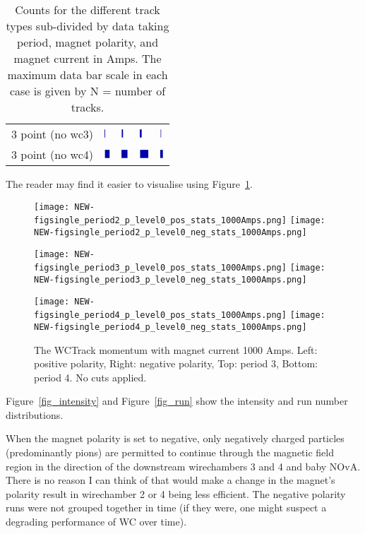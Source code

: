 \begin{table}[h]
\begin{subtable}[t]{0.48\textwidth}
\begin{tabular}{lllll}
			3 point (no wc3) & $\mybarb{0.026944444444444444}$ & $\mybarb{0.0525}$ & $\mybarb{0.06444444444444444}$ & $\mybarb{0.0175}$ \\
			3 point (no wc4) & $\mybarb{0.16416666666666666}$ & $\mybarb{0.20527777777777778}$ & $\mybarb{0.29638888888888887}$ & $\mybarb{0.09722222222222222}$ \\
			\bottomrule
		\end{tabular}
		\label{tab_p4_neg}
	\end{subtable}
	\caption[]{Counts for the different track types sub-divided by data taking period, magnet polarity, and magnet current in Amps. The maximum data bar scale in each case is given by N = number of tracks.}
	\label{tab_counts}
\end{table}

  
The reader may find it easier to visualise using Figure~\ref{fig_momentum}.

  \begin{figure}[h]
  
     	\texttt{[image: NEW-figsingle\_period2\_p\_level0\_pos\_stats\_1000Amps.png]}
	 \texttt{[image: NEW-figsingle\_period2\_p\_level0\_neg\_stats\_1000Amps.png]}
	 
   	\texttt{[image: NEW-figsingle\_period3\_p\_level0\_pos\_stats\_1000Amps.png]}
	 \texttt{[image: NEW-figsingle\_period3\_p\_level0\_neg\_stats\_1000Amps.png]}
	 
 	\texttt{[image: NEW-figsingle\_period4\_p\_level0\_pos\_stats\_1000Amps.png]}
	 \texttt{[image: NEW-figsingle\_period4\_p\_level0\_neg\_stats\_1000Amps.png]}
   \caption[short]{The WCTrack momentum with magnet current 1000 Amps. Left: positive polarity, Right: negative polarity, Top: period 3, Bottom: period 4. No cuts applied.}
   \label{fig_momentum}
  \end{figure}
 
 
 Figure~\ref{fig_intensity} and  Figure~\ref{fig_run} show the intensity and run number distributions.
  
When the magnet polarity is set to negative, only negatively charged particles (predominantly pions) are permitted to continue through the magnetic field region in the direction of the downstream wirechambers 3 and 4 and baby NOvA. There is no reason I can think of that would make a change in the magnet's polarity result in wirechamber 2 or 4 being less efficient. The negative polarity runs were not grouped together in time (if they were, one might suspect a degrading performance of WC over time).

